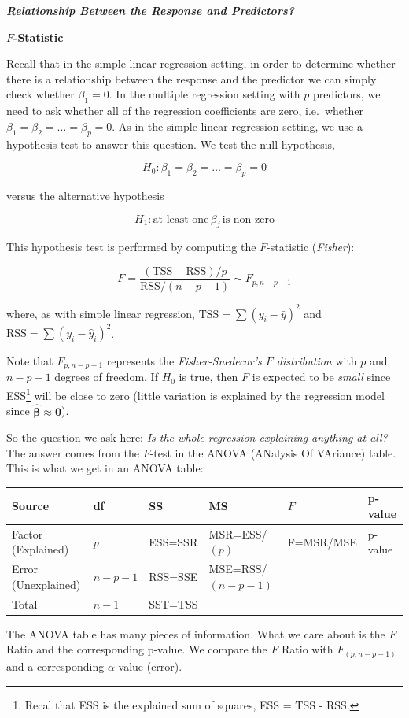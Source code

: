 \documentclass[]{book}
\let\rmarkdownfootnote\footnote%
\def\footnote{\protect\rmarkdownfootnote}
\theoremstyle{definition}
\theoremstyle{definition}
\theoremstyle{definition}
\theoremstyle{remark}
\begin{document}
\textbf{\emph{Relationship Between the Response and Predictors?}}

\textbf{\(F\)-Statistic}

Recall that in the simple linear regression setting, in order to
determine whether there is a relationship between the response and the
predictor we can simply check whether \(\beta_1 = 0\). In the multiple
regression setting with \(p\) predictors, we need to ask whether all of
the regression coefficients are zero, i.e.~whether
\(\beta_1 = \beta_2 = \ldots = \beta_p = 0\). As in the simple linear
regression setting, we use a hypothesis test to answer this question. We
test the null hypothesis,

\[ H_0 : \beta_1 = \beta_2 = \ldots = \beta_p = 0 \]

versus the alternative hypothesis

\[ H_1 : \text{at least one} \, \beta_j \, \text{is non-zero} \]

This hypothesis test is performed by computing the \(F\)-statistic
(\emph{Fisher}):

\[ F = \frac{ (\text{TSS} - \text{RSS})/p}{\text{RSS}/(n-p-1)} \sim F_{p,n-p-1} \]

where, as with simple linear regression,
\(\text{TSS} = \sum (y_i - \bar{y})^2\) and
\(\text{RSS} = \sum (y_i - \hat{y}_i)^2\).

Note that \(F_{p,n-p-1}\) represents the \emph{Fisher-Snedecor's \(F\)
distribution} with \(p\) and \(n-p-1\) degrees of freedom. If \(H_0\) is
true, then \(F\) is expected to be \emph{small} since ESS\footnote{Recal
  that ESS is the explained sum of squares, ESS = TSS - RSS.} will be
close to zero (little variation is explained by the regression model
since \(\hat{\boldsymbol{\beta}}\approx\mathbf{0}\)).

So the question we ask here: \emph{Is the whole regression explaining
anything at all?} The answer comes from the \(F\)-test in the ANOVA
(ANalysis Of VAriance) table. This is what we get in an ANOVA table:

\begin{longtable}[]{@{}llllll@{}}
\toprule
Source & df & SS & MS & \(F\) & p-value\tabularnewline
\midrule
\endhead
Factor (Explained) & \(p\) & ESS=SSR & MSR=ESS/\((p)\) & F=MSR/MSE &
p-value\tabularnewline
Error (Unexplained) & \(n-p-1\) & RSS=SSE & MSE=RSS/\((n-p-1)\) &
&\tabularnewline
Total & \(n-1\) & SST=TSS & & &\tabularnewline
\bottomrule
\end{longtable}

The ANOVA table has many pieces of information. What we care about is
the \(F\) Ratio and the corresponding p-value. We compare the \(F\)
Ratio with \(F_{(p,n-p-1)}\) and a corresponding \(\alpha\) value
(error).
\end{document}
